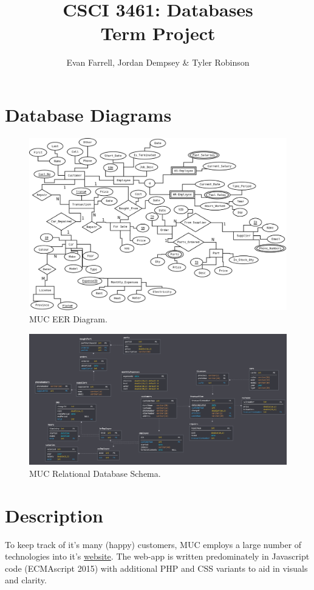 \documentclass{article}
\title{CSCI 3461: Databases\\Term Project}
\author{Evan Farrell, Jordan Dempsey \& Tyler Robinson}
\begin{document}
\maketitle
\clearpage
\section{Database Diagrams}
\begin{figure}[H]
  \center
  \includegraphics[width=.9\linewidth]{eer.png}
  \caption{MUC EER Diagram.}
  \label{fig:eer}
\end{figure}
\bigskip

\begin{figure}[H]
  \center
  \includegraphics[width=.9\linewidth]{rds.png}
  \caption{MUC Relational Database Schema.}
  \label{fig:rds}
\end{figure}

\clearpage
\section{Description}
To keep track of it's many (happy) customers, MUC employs a large number of technologies into it's \href{http://csci3461.cs.smu.ca/~tj_robinson/}{website}. The web-app is written predominately in Javascript code (ECMAscript 2015) with additional PHP and CSS variants to aid in visuals and clarity. \\
\end{document}
